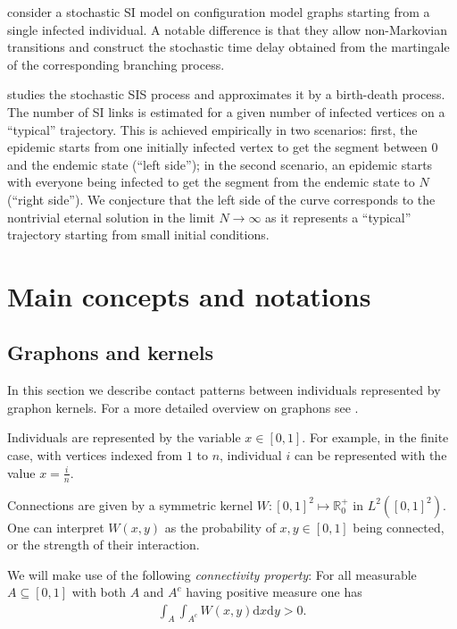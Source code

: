 \documentclass{article}
\renewcommand{\d}{\mathrm{d}}
\newcommand{\1}[1]{{\mathds{1}}_{\left\{#1\right\}}}
\newcommand{\rem}[1]{{#1}}
\begin{document}
\cite{SIR_USIC, SIR_USIC_Juli} consider a stochastic SI model on configuration model graphs starting from a single infected individual. A notable difference is that they allow non-Markovian transitions and construct the stochastic time delay obtained from the martingale of the corresponding branching process.

\cite{kiss2020} studies the stochastic SIS process and approximates it by a birth-death process. The number of SI links is estimated for a given number of infected vertices on a ``typical'' trajectory. This is achieved empirically in two scenarios: first, the epidemic starts from one initially infected vertex to get the segment between $0$ and the endemic state (``left side''); in the second scenario, an epidemic starts with everyone being infected to get the segment from the endemic state to $\rem{N}$ (``right side''). We conjecture that the left side of the curve corresponds to the nontrivial eternal solution in the limit $\rem{N} \to \infty$ as it represents a ``typical'' trajectory starting from small initial conditions.

\section{Main concepts and notations}
\label{s:notations}

\subsection{Graphons and kernels}
In this section we describe contact patterns between individuals represented by graphon kernels. For a more detailed overview on graphons see \cite{lovaszbook}. 

Individuals are represented by the variable $x \in [0,1]$. For example, in the finite case, with vertices indexed from $1$ to $n$, individual $i$ can be represented with the value $x=\frac{i}{n}.$

Connections are given by a symmetric kernel $W:[0,1]^2 \mapsto \mathbb{R}^{+}_{0}$  in $L^2 \left([0,1]^2 \right).$ One can interpret $W(x,y)$ as the probability of $x,y \in [0,1]$ being connected, or the strength of their interaction.

We will make use of the following \emph{connectivity property}: For all measurable $A \subseteq [0,1]$ with both $A$ and $A^c$ having positive measure one has
\begin{align}
\label{eq:W_connectivity}
\int_{A} \int_{A^c} W(x,y) \d x \d y>0.
\end{align}
\end{document}

